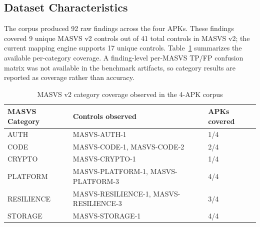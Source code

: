 \documentclass[preprint,12pt,a4paper]{elsarticle}
\begin{document}
\subsection{Dataset Characteristics}

\begin{table}[!h]
\caption{Evaluation APK corpus from \texttt{benchmark/data.csv}}
\label{tab:dataset}
\centering
\scriptsize
{}
\end{table}

The corpus produced 92 raw findings across the four APKs. These findings covered
9 unique MASVS v2 controls out of 41 total controls in MASVS v2; the current mapping
engine supports 17 unique controls. Table~\ref{tab:masvs_coverage} summarizes the
available per-category coverage. A finding-level per-MASVS TP/FP confusion matrix was
not available in the benchmark artifacts, so category results are reported as coverage
rather than accuracy.

\begin{table}[!h]
\caption{MASVS v2 category coverage observed in the 4-APK corpus}
\label{tab:masvs_coverage}
\centering
\begin{tabular}{lll}
\hline
MASVS Category & Controls observed & APKs covered \\
\hline
AUTH & MASVS-AUTH-1 & 1/4 \\
CODE & MASVS-CODE-1, MASVS-CODE-2 & 2/4 \\
CRYPTO & MASVS-CRYPTO-1 & 1/4 \\
PLATFORM & MASVS-PLATFORM-1, MASVS-PLATFORM-3 & 4/4 \\
RESILIENCE & MASVS-RESILIENCE-1, MASVS-RESILIENCE-3 & 3/4 \\
STORAGE & MASVS-STORAGE-1 & 4/4 \\
\hline
\end{tabular}
\end{table}
\end{document}
